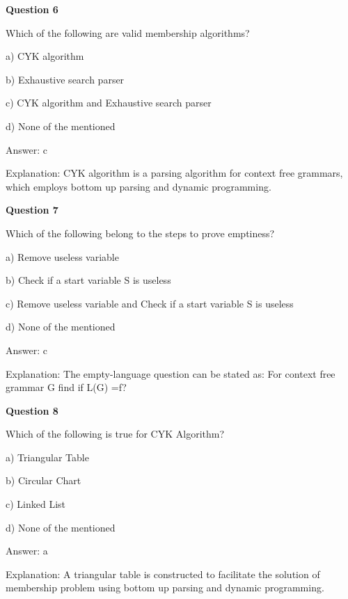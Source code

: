 \documentclass{article}
\begin{document}
\begin{mdframed}[linewidth=1pt, roundcorner=5pt, linecolor=gray!30, backgroundcolor=gray!5]
\textbf{Question 6} 

Which of the following are valid membership algorithms?

a) CYK algorithm

b) Exhaustive search parser

c) CYK algorithm and Exhaustive search parser

d) None of the mentioned
\vspace{5pt} \par
\begin{tcolorbox}[colback=green!5, colframe=green!40!black, title=Solution]
Answer: c

Explanation: CYK algorithm is a parsing algorithm for context free grammars, which employs bottom up parsing and dynamic programming.
\end{tcolorbox}
\end{mdframed}
\newpage

\begin{mdframed}[linewidth=1pt, roundcorner=5pt, linecolor=gray!30, backgroundcolor=gray!5]
\textbf{Question 7} 

Which of the following belong to the steps to prove emptiness?

a) Remove useless variable

b) Check if a start variable S is useless

c) Remove useless variable and Check if a start variable S is useless

d) None of the mentioned
\vspace{5pt} \par
\begin{tcolorbox}[colback=green!5, colframe=green!40!black, title=Solution]
Answer: c

Explanation: The empty-language question can be stated as: For context free grammar G find if L(G) =f?
\end{tcolorbox}
\end{mdframed}

\begin{mdframed}[linewidth=1pt, roundcorner=5pt, linecolor=gray!30, backgroundcolor=gray!5]
\textbf{Question 8} 

Which of the following is true for CYK Algorithm?

a) Triangular Table

b) Circular Chart

c) Linked List

d) None of the mentioned
\vspace{5pt} \par
\begin{tcolorbox}[colback=green!5, colframe=green!40!black, title=Solution]
Answer: a

Explanation: A triangular table is constructed to facilitate the solution of membership problem using bottom up parsing and dynamic programming.
\end{tcolorbox}
\end{mdframed}
\end{document}
